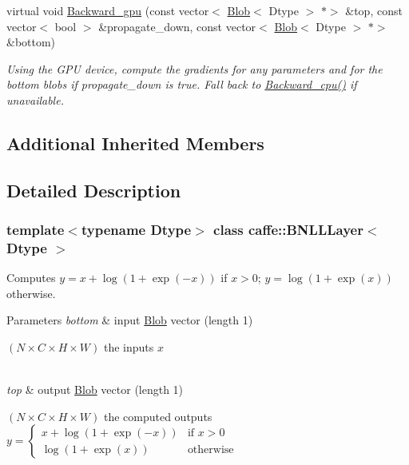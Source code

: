 \begin{DoxyCompactItemize}
virtual void \mbox{\hyperlink{classcaffe_1_1_b_n_l_l_layer_ac8a7f10b887b59194694f14e887fc6a6}{Backward\+\_\+gpu}} (const vector$<$ \mbox{\hyperlink{classcaffe_1_1_blob}{Blob}}$<$ Dtype $>$ $\ast$$>$ \&top, const vector$<$ bool $>$ \&propagate\+\_\+down, const vector$<$ \mbox{\hyperlink{classcaffe_1_1_blob}{Blob}}$<$ Dtype $>$ $\ast$$>$ \&bottom)
\begin{DoxyCompactList}\small\item\em Using the G\+PU device, compute the gradients for any parameters and for the bottom blobs if propagate\+\_\+down is true. Fall back to \mbox{\hyperlink{classcaffe_1_1_b_n_l_l_layer_a014a52e7ba756d94d2af865dc6c855dc}{Backward\+\_\+cpu()}} if unavailable. \end{DoxyCompactList}\end{DoxyCompactItemize}
\subsection*{Additional Inherited Members}


\subsection{Detailed Description}
\subsubsection*{template$<$typename Dtype$>$\newline
class caffe\+::\+B\+N\+L\+L\+Layer$<$ Dtype $>$}

Computes $ y = x + \log(1 + \exp(-x)) $ if $ x > 0 $; $ y = \log(1 + \exp(x)) $ otherwise. 


\begin{DoxyParams}{Parameters}
{\em bottom} & input \mbox{\hyperlink{classcaffe_1_1_blob}{Blob}} vector (length 1)
\begin{DoxyEnumerate}
\item $ (N \times C \times H \times W) $ the inputs $ x $ 
\end{DoxyEnumerate}\\
\hline
{\em top} & output \mbox{\hyperlink{classcaffe_1_1_blob}{Blob}} vector (length 1)
\begin{DoxyEnumerate}
\item $ (N \times C \times H \times W) $ the computed outputs $ y = \left\{ \begin{array}{ll} x + \log(1 + \exp(-x)) & \mbox{if } x > 0 \\ \log(1 + \exp(x)) & \mbox{otherwise} \end{array} \right. $ 
\end{DoxyEnumerate}\\
\hline
\end{DoxyParams}


